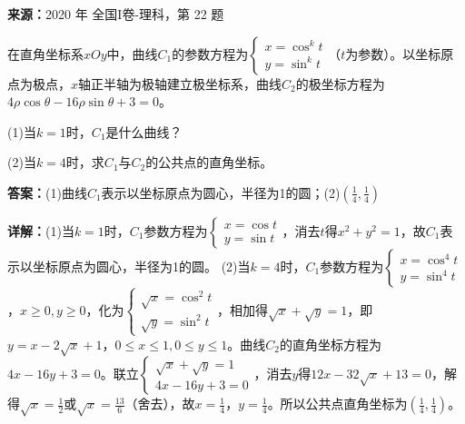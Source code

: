 \begin{question}[points=10]
\textbf{来源：}2020 年 全国I卷-理科，第 22 题\par
在直角坐标系$xOy$中，曲线$C_1$的参数方程为$\begin{cases}x=\cos^k t\\ y=\sin^k t\end{cases}$（$t$为参数）。以坐标原点为极点，$x$轴正半轴为极轴建立极坐标系，曲线$C_2$的极坐标方程为$4\rho\cos\theta-16\rho\sin\theta+3=0$。

(1)当$k=1$时，$C_1$是什么曲线？

(2)当$k=4$时，求$C_1$与$C_2$的公共点的直角坐标。
\begin{solution}
\textbf{答案：}(1)曲线$C_1$表示以坐标原点为圆心，半径为1的圆；(2)$\left(\frac{1}{4},\frac{1}{4}\right)$

\textbf{详解：}(1)当$k=1$时，$C_1$参数方程为$\begin{cases}x=\cos t\\ y=\sin t\end{cases}$，消去$t$得$x^2+y^2=1$，故$C_1$表示以坐标原点为圆心，半径为1的圆。
(2)当$k=4$时，$C_1$参数方程为$\begin{cases}x=\cos^4 t\\ y=\sin^4 t\end{cases}$，$x\geq0,y\geq0$，化为$\begin{cases}\sqrt{x}=\cos^2 t\\ \sqrt{y}=\sin^2 t\end{cases}$，相加得$\sqrt{x}+\sqrt{y}=1$，即$y=x-2\sqrt{x}+1$，$0\leq x\leq1,0\leq y\leq1$。曲线$C_2$的直角坐标方程为$4x-16y+3=0$。联立$\begin{cases}\sqrt{x}+\sqrt{y}=1\\ 4x-16y+3=0\end{cases}$，消去$y$得$12x-32\sqrt{x}+13=0$，解得$\sqrt{x}=\frac{1}{2}$或$\sqrt{x}=\frac{13}{6}$（舍去），故$x=\frac{1}{4}$，$y=\frac{1}{4}$。所以公共点直角坐标为$\left(\frac{1}{4},\frac{1}{4}\right)$。
\end{solution}
\end{question}

